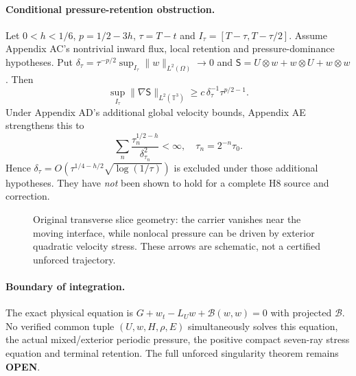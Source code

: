 \paragraph{Conditional pressure-retention obstruction.}
Let $0<h<1/6$, $p=1/2-3h$, $\tau=T-t$ and $I_\tau=[T-\tau,T-\tau/2]$. Assume Appendix AC's nontrivial inward flux, local retention and pressure-dominance hypotheses. Put
$\delta_\tau=\tau^{-p/2}\sup_{I_\tau}\|w\|_{L^2(\Omega)}\to0$ and
$\mathsf S=U\otimes w+w\otimes U+w\otimes w$. Then
\[
\sup_{I_\tau}\|\nabla\mathsf S\|_{L^2(\mathbb T^3)}
\ge c\,\delta_\tau^{-1}\tau^{p/2-1}.
\]
Under Appendix AD's additional global velocity bounds, Appendix AE strengthens this to
\[
\boxed{\sum_n\frac{\tau_n^{1/2-h}}{\delta_{\tau_n}^2}<\infty,\quad \tau_n=2^{-n}\tau_0.}
\]
Hence $\delta_\tau=O(\tau^{1/4-h/2}\sqrt{\log(1/\tau)})$ is excluded under those additional hypotheses. They have \emph{not} been shown to hold for a complete H8 source and correction.

\begin{figure}[htbp]\centering
{}
\caption{Original transverse slice geometry: the carrier vanishes near the moving interface, while nonlocal pressure can be driven by exterior quadratic velocity stress. These arrows are schematic, not a certified unforced trajectory.}
\end{figure}

\paragraph{Boundary of integration.}
The exact physical equation is
$G+w_t-L_Uw+\mathcal B(w,w)=0$ with projected $\mathcal B$.
No verified common tuple $(U,w,H,\rho,E)$ simultaneously solves this equation, the actual mixed/exterior periodic pressure, the positive compact seven-ray stress equation and terminal retention. The full unforced singularity theorem remains \textbf{OPEN}.
